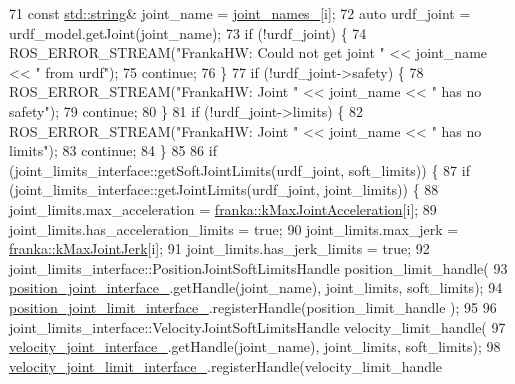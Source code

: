 \begin{DoxyCode}
71     \textcolor{keyword}{const} \hyperlink{namespacetesting_1_1internal_a8e8ff5b11e64078831112677156cb111}{std::string}& joint\_name = \hyperlink{classfranka__hw_1_1FrankaHW_a209e8f3424efe0fd05725be609d7205a}{joint\_names\_}[i];
72     \textcolor{keyword}{auto} urdf\_joint = urdf\_model.getJoint(joint\_name);
73     \textcolor{keywordflow}{if} (!urdf\_joint) \{
74       ROS\_ERROR\_STREAM(\textcolor{stringliteral}{"FrankaHW: Could not get joint "} << joint\_name << \textcolor{stringliteral}{" from urdf"});
75       \textcolor{keywordflow}{continue};
76     \}
77     \textcolor{keywordflow}{if} (!urdf\_joint->safety) \{
78       ROS\_ERROR\_STREAM(\textcolor{stringliteral}{"FrankaHW: Joint "} << joint\_name << \textcolor{stringliteral}{" has no safety"});
79       \textcolor{keywordflow}{continue};
80     \}
81     \textcolor{keywordflow}{if} (!urdf\_joint->limits) \{
82       ROS\_ERROR\_STREAM(\textcolor{stringliteral}{"FrankaHW: Joint "} << joint\_name << \textcolor{stringliteral}{" has no limits"});
83       \textcolor{keywordflow}{continue};
84     \}
85 
86     \textcolor{keywordflow}{if} (joint\_limits\_interface::getSoftJointLimits(urdf\_joint, soft\_limits)) \{
87       \textcolor{keywordflow}{if} (joint\_limits\_interface::getJointLimits(urdf\_joint, joint\_limits)) \{
88         joint\_limits.max\_acceleration = \hyperlink{namespacefranka_a826ecf0b7d214df69c1ee416d3e66b93}{franka::kMaxJointAcceleration}[i];
89         joint\_limits.has\_acceleration\_limits = \textcolor{keyword}{true};
90         joint\_limits.max\_jerk = \hyperlink{namespacefranka_a600a21a6151ff2eee38294293dd8aeec}{franka::kMaxJointJerk}[i];
91         joint\_limits.has\_jerk\_limits = \textcolor{keyword}{true};
92         joint\_limits\_interface::PositionJointSoftLimitsHandle position\_limit\_handle(
93             \hyperlink{classfranka__hw_1_1FrankaHW_aed81f869c0785e8257c9b21ce3a54f48}{position\_joint\_interface\_}.getHandle(joint\_name), joint\_limits, 
      soft\_limits);
94         \hyperlink{classfranka__hw_1_1FrankaHW_a0453d8d00992ae08ddd47083a21abcc8}{position\_joint\_limit\_interface\_}.registerHandle(position\_limit\_handle
      );
95 
96         joint\_limits\_interface::VelocityJointSoftLimitsHandle velocity\_limit\_handle(
97             \hyperlink{classfranka__hw_1_1FrankaHW_aae00e8f592019644703aaebcc8b6d8db}{velocity\_joint\_interface\_}.getHandle(joint\_name), joint\_limits, 
      soft\_limits);
98         \hyperlink{classfranka__hw_1_1FrankaHW_a4e85e4440436f97a169553d281049e4e}{velocity\_joint\_limit\_interface\_}.registerHandle(velocity\_limit\_handle

\end{DoxyCode}
